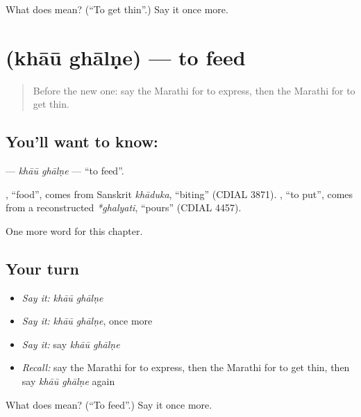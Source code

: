 \begin{tcolorbox}[breakable,colback=teal!4,colframe=teal!35!black,title={Before you move on}]
What does   mean? (\textquotedblleft{}To get thin\textquotedblright{}.) Say it once more.
\end{tcolorbox}
\section[\texorpdfstring{\mr{खाऊ} \mr{घालणे} (khāū ghālṇe)}{खाऊ घालणे (khāū ghālṇe)}]{  (khāū ghālṇe) — to feed}

\label{lesson:MR-C256-khau-ghalne}



\begin{quote}
Before the new one: say the Marathi for to express, then the Marathi for to get thin.
\end{quote}

\subsection*{You'll want to know:  }
\textbf{ } — \emph{khāū ghālṇe} — \textquotedblleft{}to feed\textquotedblright{}.

\begin{cousinweb}
\textbf{}, \textquotedblleft{}food\textquotedblright{}, comes from Sanskrit \emph{khāduka}, \textquotedblleft{}biting\textquotedblright{} (CDIAL 3871). \textbf{}, \textquotedblleft{}to put\textquotedblright{}, comes from a reconstructed \emph{*ghalyati}, \textquotedblleft{}pours\textquotedblright{} (CDIAL 4457).
\end{cousinweb}

\begin{grammarlens}[title={What you've built}]
One more word for this chapter.
\end{grammarlens}

\subsection*{Your turn}
\begin{itemize}
\raggedright
  \item \emph{Say it:} \emph{khāū ghālṇe}
  \item \emph{Say it:} \emph{khāū ghālṇe}, once more
  \item \emph{Say it:} say \emph{khāū ghālṇe}
  \item \emph{Recall:} say the Marathi for to express, then the Marathi for to get thin, then say \emph{khāū ghālṇe} again
\end{itemize}

\begin{tcolorbox}[breakable,colback=teal!4,colframe=teal!35!black,title={Before you move on}]
What does   mean? (\textquotedblleft{}To feed\textquotedblright{}.) Say it once more.
\end{tcolorbox}
